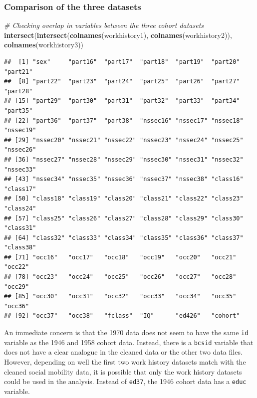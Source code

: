\documentclass[
]{article}
\newenvironment{Shaded}{\begin{snugshade}}{\end{snugshade}}
\newcommand{\CommentTok}[1]{\textcolor[rgb]{0.56,0.35,0.01}{\textit{#1}}}
\newcommand{\FunctionTok}[1]{\textcolor[rgb]{0.13,0.29,0.53}{\textbf{#1}}}
\newcommand{\NormalTok}[1]{#1}
\begin{document}
\subsubsection{Comparison of the three
datasets}\label{comparison-of-the-three-datasets}

\begin{Shaded}
\begin{Highlighting}[]
\CommentTok{\# Checking overlap in variables between the three cohort datasets}
\FunctionTok{intersect}\NormalTok{(}\FunctionTok{intersect}\NormalTok{(}\FunctionTok{colnames}\NormalTok{(workhistory1), }\FunctionTok{colnames}\NormalTok{(workhistory2)),  }
          \FunctionTok{colnames}\NormalTok{(workhistory3))}
\end{Highlighting}
\end{Shaded}

\begin{verbatim}
##  [1] "sex"     "part16"  "part17"  "part18"  "part19"  "part20"  "part21" 
##  [8] "part22"  "part23"  "part24"  "part25"  "part26"  "part27"  "part28" 
## [15] "part29"  "part30"  "part31"  "part32"  "part33"  "part34"  "part35" 
## [22] "part36"  "part37"  "part38"  "nssec16" "nssec17" "nssec18" "nssec19"
## [29] "nssec20" "nssec21" "nssec22" "nssec23" "nssec24" "nssec25" "nssec26"
## [36] "nssec27" "nssec28" "nssec29" "nssec30" "nssec31" "nssec32" "nssec33"
## [43] "nssec34" "nssec35" "nssec36" "nssec37" "nssec38" "class16" "class17"
## [50] "class18" "class19" "class20" "class21" "class22" "class23" "class24"
## [57] "class25" "class26" "class27" "class28" "class29" "class30" "class31"
## [64] "class32" "class33" "class34" "class35" "class36" "class37" "class38"
## [71] "occ16"   "occ17"   "occ18"   "occ19"   "occ20"   "occ21"   "occ22"  
## [78] "occ23"   "occ24"   "occ25"   "occ26"   "occ27"   "occ28"   "occ29"  
## [85] "occ30"   "occ31"   "occ32"   "occ33"   "occ34"   "occ35"   "occ36"  
## [92] "occ37"   "occ38"   "fclass"  "IQ"      "ed426"   "cohort"
\end{verbatim}

An immediate concern is that the 1970 data does not seem to have the
same \texttt{id} variable as the 1946 and 1958 cohort data. Instead,
there is a \texttt{bcsid} variable that does not have a clear analogue
in the cleaned data or the other two data files. However, depending on
well the first two work history datasets match with the cleaned social
mobility data, it is possible that only the work history datasets could
be used in the analysis. Instead of \texttt{ed37}, the 1946 cohort data
has a \texttt{educ} variable.
\end{document}
